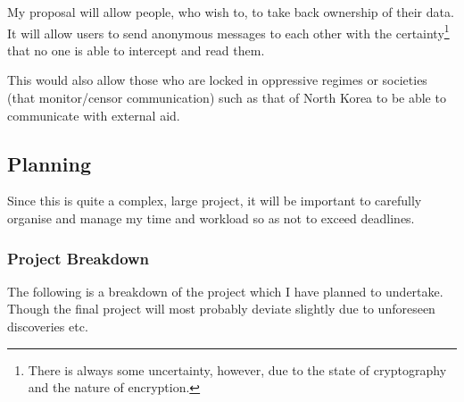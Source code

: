 \documentclass{article}
\begin{document}
My proposal will allow people, who wish to, to take back ownership of their data. It will allow users to send anonymous messages to each other with the certainty\footnote{There is always some uncertainty, however, due to the state of cryptography and the nature of encryption.} that no one is able to intercept and read them.

This would also allow those who are locked in oppressive regimes or societies (that monitor/censor communication) such as that of North Korea to be able to communicate with external aid.

\newpage
\subsection{Planning}
Since this is quite a complex, large project, it will be important to carefully organise and manage my time and workload so as not to exceed deadlines.

\subsubsection{Project Breakdown}
The following is a breakdown of the project which I have planned to undertake. Though the final project will most probably deviate slightly due to unforeseen discoveries etc.
\end{document}
